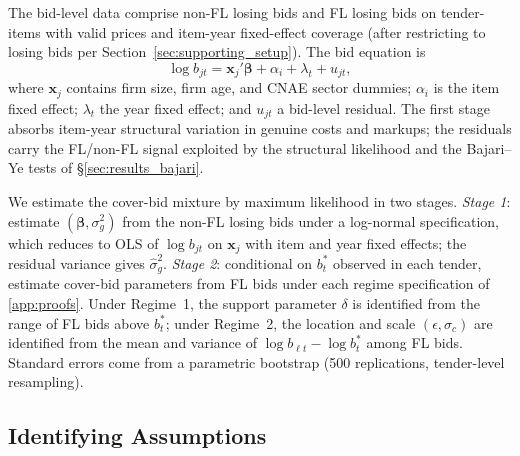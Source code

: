The bid-level data comprise \valStatusBidsTotal non-FL losing bids
and \valItemsCount FL losing bids on \valStatusBidsTotal tender-items with
valid prices and item-year fixed-effect coverage (after
restricting to losing bids per
Section~\ref{sec:supporting_setup}). The bid equation is
\begin{equation}
  \log b_{jt} = \mathbf{x}_j' \boldsymbol{\beta}
  + \alpha_i + \lambda_t + u_{jt},
  \label{eq:by_first_stage}
\end{equation}
where $\mathbf{x}_j$ contains firm size, firm age, and CNAE
sector dummies; $\alpha_i$ is the item fixed effect; $\lambda_t$
the year fixed effect; and $u_{jt}$ a bid-level residual. The
first stage absorbs item-year structural variation in genuine
costs and markups; the residuals carry the FL/non-FL signal
exploited by the structural likelihood and the Bajari--Ye tests
of \S\ref{sec:results_bajari}.

We estimate the cover-bid mixture by maximum likelihood in two
stages. \emph{Stage 1}: estimate
$(\boldsymbol{\beta}, \sigma_g^2)$ from the non-FL losing bids
under a log-normal specification, which reduces to OLS of
$\log b_{jt}$ on $\mathbf{x}_j$ with item and year fixed
effects; the residual variance gives $\hat{\sigma}_g^2$.
\emph{Stage 2}: conditional on $b^*_t$ observed in each tender,
estimate cover-bid parameters from FL bids under each regime
specification of \ref{app:proofs}. Under Regime~1, the support
parameter $\delta$ is identified from the range of FL bids
above $b^*_t$; under Regime~2, the location and scale
$(\epsilon, \sigma_c)$ are identified from the mean and
variance of $\log b_{\ell t} - \log b^*_t$ among FL bids.
Standard errors come from a parametric bootstrap (500
replications, tender-level resampling).

\subsection{Identifying Assumptions}

